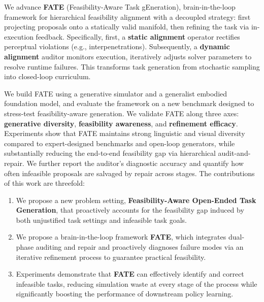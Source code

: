 \documentclass{article}
\theoremstyle{plain}
\theoremstyle{definition}
\theoremstyle{remark}
\begin{document}
We advance \textbf{FATE} (Feasibility-Aware Task gEneration), brain-in-the-loop framework for hierarchical feasibility alignment with a decoupled strategy: first projecting proposals onto a statically valid manifold, then refining the task via in-execution feedback. Specifically, first, a \textbf{static alignment} operator rectifies perceptual violations (e.g., interpenetrations). Subsequently, a \textbf{dynamic alignment} auditor monitors execution, iteratively adjusts solver parameters to resolve runtime failures. This transforms task generation from stochastic sampling into closed-loop curriculum.

We build FATE using a generative simulator and a generalist embodied foundation model, and evaluate the framework on a new benchmark designed to stress-test feasibility-aware generation. We validate FATE along three axes: \textbf{generative diversity}, \textbf{feasibility awareness}, and \textbf{refinement efficacy}. Experiments show that FATE maintains strong linguistic and visual diversity compared to expert-designed benchmarks and open-loop generators, while substantially reducing the end-to-end feasibility gap via hierarchical audit-and-repair. We further report the auditor's diagnostic accuracy and quantify how often infeasible proposals are salvaged by repair across stages. The contributions of this work are threefold:
\begin{enumerate}
    \setlength{\itemsep}{0pt}
    \setlength{\parskip}{0pt}
    \setlength{\parsep}{0pt}
    \item We propose a new problem setting, \textbf{Feasibility-Aware Open-Ended Task Generation}, that proactively accounts for the feasibility gap induced by both unjustified task settings and infeasible task goals.
    \item We propose a brain-in-the-loop framework \textbf{FATE}, which integrates dual-phase auditing and repair and proactively diagnoses failure modes via an iterative refinement process to guarantee practical feasibility.
    \item Experiments demonstrate that \textbf{FATE} can effectively identify and correct infeasible tasks, reducing simulation waste at every stage of the process while significantly boosting the performance of downstream policy learning.
\end{enumerate}
\end{document}
